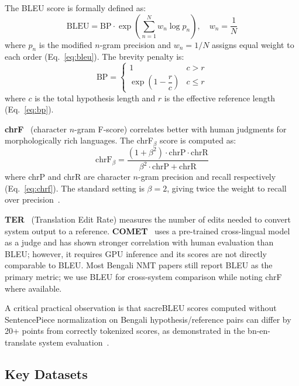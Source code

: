 \documentclass[conference]{IEEEtran}
\begin{document}
The BLEU score is formally defined as:
\begin{equation}
\text{BLEU} = \text{BP} \cdot \exp\!\left(\sum_{n=1}^{N} w_n \log p_n\right),
\quad w_n = \frac{1}{N}
\label{eq:bleu}
\end{equation}
where $p_n$ is the modified $n$-gram precision and $w_n = 1/N$ assigns
equal weight to each order (Eq.~\eqref{eq:bleu}). The brevity penalty is:
\begin{equation}
\text{BP} = \begin{cases}
1 & c > r \\
\exp\!\left(1 - \dfrac{r}{c}\right) & c \le r
\end{cases}
\label{eq:bp}
\end{equation}
where $c$ is the total hypothesis length and $r$ is the effective
reference length (Eq.~\eqref{eq:bp}).

\textbf{chrF}~\cite{popovic2015chrf} (character $n$-gram F-score) correlates
better with human judgments for morphologically rich languages.
The chrF$_\beta$ score is computed as:
\begin{equation}
\text{chrF}_{\beta} = \frac{(1+\beta^2)\cdot\text{chrP}\cdot\text{chrR}}%
{\beta^2\cdot\text{chrP} + \text{chrR}}
\label{eq:chrf}
\end{equation}
where chrP and chrR are character $n$-gram precision and recall respectively
(Eq.~\eqref{eq:chrf}).
The standard setting is $\beta = 2$, giving twice the weight to recall over
precision~\cite{popovic2015chrf}.

\textbf{TER}~\cite{snover2006ter} (Translation Edit Rate) measures the
number of edits needed to convert system output to a reference.
\textbf{COMET}~\cite{rei2020comet} uses a pre-trained cross-lingual model
as a judge and has shown stronger correlation with human evaluation than
BLEU; however, it requires GPU inference and its scores are not directly
comparable to BLEU.
Most Bengali NMT papers still report BLEU as the primary metric; we use
BLEU for cross-system comparison while noting chrF where available.

A critical practical observation is that sacreBLEU scores computed without
SentencePiece normalization on Bengali hypothesis/reference pairs can differ
by 20+ points from correctly tokenized scores, as demonstrated in the
bn-en-translate system evaluation~\cite{biswas2025bnentr}.

\subsection{Key Datasets}
\end{document}
